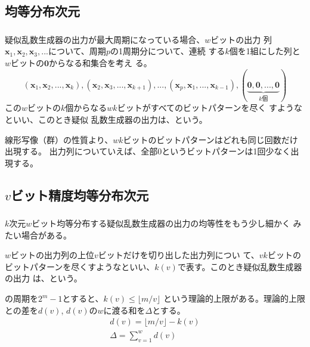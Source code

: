 \documentclass[cjk, dvips, handout, trans, xcolor=dvipsnames]{beamer}
\def\bx{{{\mathbf x}}}
\begin{document}
\subsection{均等分布次元}
\begin{frame}[t]
  \frametitle{\insertsubsection}

  疑似乱数生成器の出力が最大周期になっている場合、$w$ビットの出力
  列$\bx_1, \bx_2, \bx_3, ...$について、周期$p$の1周期分について、連続
  する$k$個を1組にした列と$w$ビットの$\mathbf{0}$からなる和集合を考え
  る。
  \[
  (\bx_1, \bx_2, ..., \bx_k), (\bx_2, \bx_3, ..., \bx_{k+1}), ...,
  (\bx_{p}, \bx_{1}, ..., \bx_{k-1}), (\underbrace{\mathbf{0},
    \mathbf{0}, ..., \mathbf{0}}_{k\text{個}})
  \]
  \pause
  この$w$ビットの$k$個からなる$wk$ビットがすべてのビットパターンを尽く
  すようなといい、このとき疑似
  乱数生成器の出力は、という。


  \pause
  \vspace{\baselineskip}
  線形写像（群）の性質より、$wk$ビットのビットパターンはどれも同じ回数だけ出現する。
  出力列についていえば、全部$0$というビットパターンは1回少なく出現する。
\end{frame}

\subsection{$v$ビット精度均等分布次元}
\begin{frame}[t]
  \frametitle{\insertsubsection}

  $k$次元$w$ビット均等分布する疑似乱数生成器の出力の均等性をもう少し細かく
  みたい場合がある。

  \pause
  \vspace{\baselineskip}
  $w$ビットの出力列の上位$v$ビットだけを切り出した出力列につい
  て、$vk$ビットのビットパターンを尽くすようなといい、$k(v)$で表す。このとき疑似乱数生成器の出力
  は、という。

  \pause
  \vspace{\baselineskip}
  \FLPRNG の周期を$2^m-1$とすると、$k(v) \le \lfloor m/v \rfloor$
  という理論的上限がある。理論的上限との差を$d(v)$, $d(v)$の$w$に渡る和を$\Delta$とする。
  \begin{gather*}
    d(v) = \lfloor m/v \rfloor - k(v)\\
    \Delta = \sum_{v = 1}^w d(v)
  \end{gather*}
\end{frame}
\end{document}

